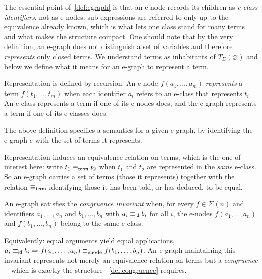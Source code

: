 \noindent
The essential point of~\cref{def:egraph} is that an e-node
records its children as \emph{e-class identifiers}, not as e-nodes:
sub-expressions are referred to only up to the equivalence already
known, which is what lets one class stand for many terms and what makes
the structure compact. 
One should note that by the very definition, an e-graph does not distinguish a set of variables and therefore \emph{represents} only closed terms.
We understand terms as inhabitants of $T_\Sigma(\varnothing)$ and below we define what it means for an e-graph to represent a term.

\begin{definition}
\label{def:represented}
Representation is defined by recursion. An e-node $f(a_1, \dots, a_m)$
\emph{represents} a term $f(t_1, \dots, t_m)$ when each identifier
$a_i$ refers to an e-class that represents $t_i$. An e-class represents
a term if one of its e-nodes does, and the e-graph represents a term if
one of its e-classes does.
\end{definition}

\begin{remark}
The above definition specifies a semantics for a given e-graph, by identifying the e-graph $e$ with the set of terms it represents.
\end{remark}

\noindent
Representation induces an equivalence relation on terms, which is the
one of interest here: write $t_1 \equiv_{\sf term} t_2$ when $t_1$ and $t_2$ are
represented in the \emph{same} e-class. So an e-graph carries a set of
terms (those it represents) together with the relation $\equiv_{\sf term}$
identifying those it has been told, or has deduced, to be equal.

\begin{definition}
\label{def:cong-invariant}
An e-graph satisfies the \emph{congruence invariant} when, for every
$f \in \Sigma(n)$ and identifiers $a_1, \dots, a_n$ and $b_1, \dots,
b_n$ with $a_i \equiv_{\sf id} b_i$ for all $i$, the e-nodes $f(a_1, \dots, a_n)$
and $f(b_1, \dots, b_n)$ belong to the same e-class.
\end{definition}

\noindent
Equivalently: equal arguments yield equal applications, $a_i \equiv_{\sf id} b_i
\Rightarrow f(a_1, \ldots, a_n) \equiv_{\mathrm{enode}} f(b_1, \ldots, b_n)$. An e-graph maintaining this
invariant represents not merely an equivalence relation on terms but a
\emph{congruence}---which is exactly the structure
~\cref{def:congruence} requires.

